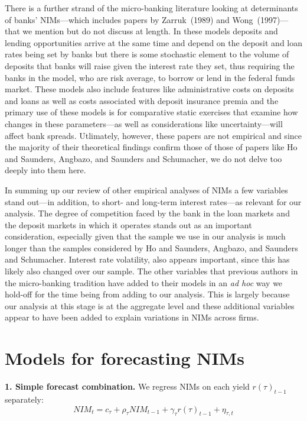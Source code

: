 \documentclass[11pt]{article}
\begin{document}
There is a further strand of the micro-banking literature looking at determinants of banks' NIMs---which includes papers by Zarruk~(1989) and Wong~(1997)---that we mention but do not discuss at length.  In these models deposits and lending opportunities arrive at the same time and depend on the deposit and loan rates being set by banks but there is some stochastic element to the volume of deposits that banks will raise given the interest rate they set, thus requiring the banks in the model, who are risk average, to borrow or lend in the federal funds market.  These models also include features like administrative costs on deposits and loans as well as costs associated with deposit insurance premia and the primary use of these models is for comparative static exercises that examine how changes in these parameters---as well as considerations like uncertainty---will affect bank spreads.  Utlimately, however, these papers are not empirical and since the majority of their theoretical findings confirm those of those of papers like Ho and Saunders, Angbazo, and Saunders and Schumacher, we do not delve too deeply into them here.

In summing up our review of other empirical analyses of NIMs a few variables stand out---in addition, to short- and long-term interest rates---as relevant for our analysis.  The degree of competition faced by the bank in the loan markets and the deposit markets in which it operates stands out as an important consideration, especially given that the sample we use in our analysis is much longer than the samples considered by Ho and Saunders, Angbazo, and Saunders and Schumacher.  Interest rate volatility, also appears important, since this has likely also changed over our sample.  The other variables that previous authors in the micro-banking tradition have added to their models in an \textit{ad hoc} way we hold-off for the time being from adding to our analysis.  This is largely because our analysis at this stage is at the aggregate level and these additional variables appear to have been added to explain variations in NIMs across firms.

\section{Models for forecasting NIMs}

\vspace{-0.1in}
\noindent \textbf{1. Simple forecast combination.} We regress NIMs on each yield $r(\tau )_{t-1}$ separately: \
\[
NIM_{t}=c_{\tau }+\rho _{\tau }NIM_{t-1}+\gamma _{\tau }r(\tau )_{t-1}+{\eta
_{\tau ,t}}
\]
\end{document}
